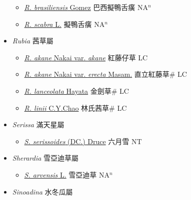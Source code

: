 \begin{itemize}
  \begin{itemize}
        \item[] \href{http://www.theplantlist.org/tpl1.1/search?q=Richardia+brasiliensis}{\textit{R. brasiliensis} Gomez}   巴西擬鴨舌癀 NA$^n$
        \item[] \href{http://www.theplantlist.org/tpl1.1/search?q=Richardia+scabra}{\textit{R. scabra} L.}   擬鴨舌癀 NA$^n$
  \end{itemize}
 \item[] \textit{Rubia} 茜草屬
                    
  \begin{itemize}
        \item[] \href{http://www.theplantlist.org/tpl1.1/search?q=Rubia+akane+var.+akane}{\textit{R. akane} Nakai var. \textit{akane}}   紅藤仔草 LC
        \item[] \href{http://www.theplantlist.org/tpl1.1/search?q=Rubia+akane+var.+erecta}{\textit{R. akane} Nakai var. \textit{erecta} Masam.}   直立紅藤草\# LC
        \item[] \href{http://www.theplantlist.org/tpl1.1/search?q=Rubia+lanceolata}{\textit{R. lanceolata} Hayata}   金劍草\# LC
        \item[] \href{http://www.theplantlist.org/tpl1.1/search?q=Rubia+linii}{\textit{R. linii} C.Y.Chao}   林氏茜草\# LC
  \end{itemize}
 \item[] \textit{Serissa} 滿天星屬
                    
  \begin{itemize}
        \item[] \href{http://www.theplantlist.org/tpl1.1/search?q=Serissa+serissoides}{\textit{S. serissoides} (DC.) Druce}   六月雪 NT
  \end{itemize}
 \item[] \textit{Sherardia} 雪亞迪草屬
                    
  \begin{itemize}
        \item[] \href{http://www.theplantlist.org/tpl1.1/search?q=Sherardia+arvensis}{\textit{S. arvensis} L.}   雪亞迪草 NA$^n$
  \end{itemize}
 \item[] \textit{Sinoadina} 水冬瓜屬
                    

\end{itemize}
